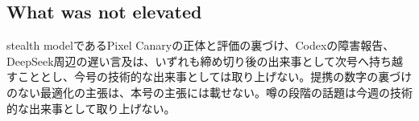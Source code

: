 \subsection*{What was not elevated}
stealth modelであるPixel Canaryの正体と評価の裏づけ\cite{w39x-c8-pixel}、Codexの障害報告\cite{w39x-c9-codex}、DeepSeek周辺の遅い言及\cite{w39x-c5-deepseek-eval}は、いずれも締め切り後の出来事として次号へ持ち越すこととし、今号の技術的な出来事としては取り上げない。提携の数字の裏づけのない最適化の主張\cite{tbcaws}は、本号の主張には載せない。噂の段階の話題は今週の技術的な出来事として取り上げない。
